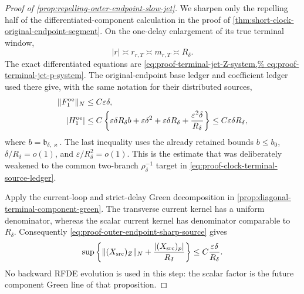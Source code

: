 \begin{proof}[Proof of
\cref{prop:repelling-outer-endpoint-slow-jet}]
We sharpen only the repelling half of the differentiated-component
calculation in the proof of
\cref{thm:short-clock-original-endpoint-segment}.  On the one-delay
enlargement of its true terminal window,
\[
 |r|\asymp r_{r,T}\asymp m_{r,T}\asymp R_\delta.
\]
The exact differentiated equations are
\cref{eq:proof-terminal-jet-Z-system,%
eq:proof-terminal-jet-p-system}.  The original-endpoint base ledger and
coefficient ledger used there give, with the same notation for their
distributed sources,
\begin{align}
 \|F_1^{\rm oe}\|_N&\le C\varepsilon\delta,\notag\\
 |H_1^{\rm oe}|
 &\le C\left\{
   \varepsilon\delta R_\delta b
  +\varepsilon\delta^2
  +\varepsilon\delta R_\delta
  +\frac{\varepsilon^2\delta}{R_\delta}\right\}
 \le C\varepsilon\delta R_\delta,               \label{eq:proof-outer-endpoint-sharp-source}
\end{align}
where \(b=\mathfrak b_{\delta,\varkappa}\).  The last inequality uses
the already retained bounds \(b\le b_0\),
\(\delta/R_\delta=o(1)\), and
\(\varepsilon/R_\delta^2=o(1)\).  This is the estimate that was
deliberately weakened to the common two-branch
\(\rho_\delta^{-1}\) target in
\cref{eq:proof-clock-terminal-source-ledger}.

Apply the current-loop and strict-delay Green decomposition in
\cref{prop:diagonal-terminal-component-green}.  The transverse current
kernel has a uniform denominator, whereas the scalar current kernel has
denominator comparable to \(R_\delta\).  Consequently
\cref{eq:proof-outer-endpoint-sharp-source} gives
\begin{equation}
 \sup\left\{\|(X_{\rm src})_Z\|_N
       +\frac{|(X_{\rm src})_p|}{R_\delta}\right\}
 \le C\frac{\varepsilon\delta}{R_\delta}.       \label{eq:proof-outer-endpoint-source-output}
\end{equation}
No backward RFDE evolution is used in this step: the scalar factor is the
future component Green line of that proposition.


\end{proof}
